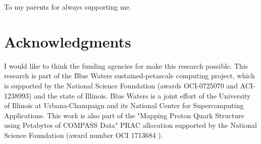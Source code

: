 \documentclass[edeposit,fullpage]{Classes/uiucthesis2009}
\begin{document}
\begin{dedication}
To my parents for always supporting me.
\end{dedication}

\chapter*{Acknowledgments}

I would like to think the funding agencies for make this research possible.
This research is part of the Blue Waters sustained-petascale
computing project, which is supported by the National Science
Foundation (awards OCI-0725070 and ACI-1238993) and the state of
Illinois. Blue Waters is a joint effort of the University of Illinois
at Urbana-Champaign and its National Center for Supercomputing
Applications. This work is also part of the "Mapping Proton Quark
Structure using Petabytes of COMPASS Data" PRAC allocation supported
by the National Science Foundation (award number OCI 1713684 ).



\tableofcontents
\listoftables
\listoffigures


\mainmatter
\renewcommand{\thepage}{\arabic{page}}









\begin{appendices}
 
\end{appendices}

\renewcommand{\chaptername}{}
\renewcommand{\thechapter}{} 
%

%
{}
\end{document}
